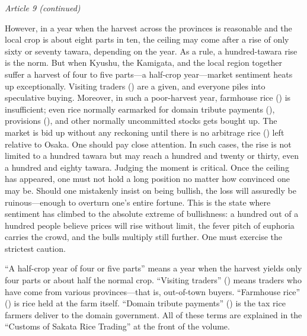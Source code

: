 \begin{sokyubox}
{\small\itshape\color{sokyubar} Article 9 (continued)}

\medskip
However, in a year when the harvest across the provinces is reasonable
and the local crop is about eight parts in ten, the ceiling may come
after a rise of only sixty or seventy tawara, depending on the year. As
a rule, a hundred-tawara rise is the norm. But when Kyushu, the
Kamigata, and the local region together suffer a harvest of four to five
parts---a half-crop year---market sentiment heats up exceptionally.
Visiting traders () are a given, and everyone piles
into speculative buying. Moreover, in such a poor-harvest year, farmhouse
rice () is insufficient; even rice normally earmarked
for domain tribute payments (),
provisions (), and other normally uncommitted stocks
gets bought up. The market is bid up without any reckoning until there is
no arbitrage rice () left relative to Osaka. One
should pay close attention. In such cases, the rise is not limited to a
hundred tawara but may reach a hundred and twenty or thirty, even a
hundred and eighty tawara. Judging the moment is critical. Once the
ceiling has appeared, one must not hold a long position no matter how
convinced one may be. Should one mistakenly insist on being bullish, the
loss will assuredly be ruinous---enough to overturn one's entire fortune.
This is the state where sentiment has climbed to the absolute extreme of
bullishness: a hundred out of a hundred people believe prices will rise
without limit, the fever pitch of euphoria carries the crowd, and the
bulls multiply still further. One must exercise the strictest caution.
\end{sokyubox}

\commentary
``A half-crop year of four or five parts'' means a year when the harvest
yields only four parts or about half the normal crop. ``Visiting
traders'' () means traders who have come from various
provinces---that is, out-of-town buyers. ``Farmhouse rice''
() is rice held at the farm itself. ``Domain tribute
payments'' () is the tax rice farmers deliver to the domain
government. All of these terms are explained in the ``Customs of Sakata
Rice Trading'' at the front of the volume.

